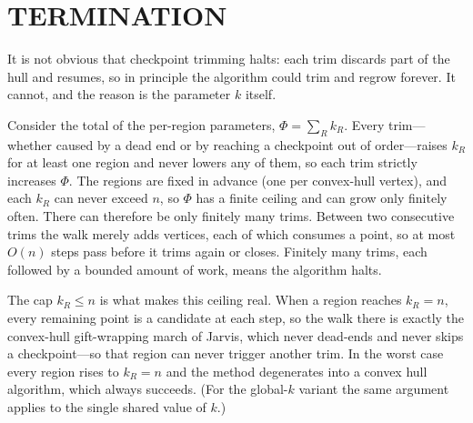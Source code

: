 \documentclass[a4paper,twoside]{article}
\begin{document}
\section{\uppercase{Termination}}
It is not obvious that checkpoint trimming halts: each trim discards part of the hull and resumes, so in principle the algorithm could trim and regrow forever. It cannot, and the reason is the parameter $k$ itself.

Consider the total of the per-region parameters, $\Phi = \sum_{R} k_R$. Every trim---whether caused by a dead end or by reaching a checkpoint out of order---raises $k_R$ for at least one region and never lowers any of them, so each trim strictly increases $\Phi$. The regions are fixed in advance (one per convex-hull vertex), and each $k_R$ can never exceed $n$, so $\Phi$ has a finite ceiling and can grow only finitely often. There can therefore be only finitely many trims. Between two consecutive trims the walk merely adds vertices, each of which consumes a point, so at most $O(n)$ steps pass before it trims again or closes. Finitely many trims, each followed by a bounded amount of work, means the algorithm halts.

The cap $k_R \le n$ is what makes this ceiling real. When a region reaches $k_R = n$, every remaining point is a candidate at each step, so the walk there is exactly the convex-hull gift-wrapping march of Jarvis, which never dead-ends and never skips a checkpoint---so that region can never trigger another trim. In the worst case every region rises to $k_R = n$ and the method degenerates into a convex hull algorithm, which always succeeds. (For the global-$k$ variant the same argument applies to the single shared value of $k$.)
\end{document}
